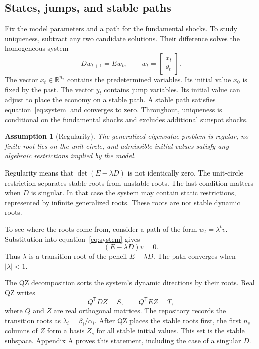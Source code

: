 \documentclass[11pt]{article}
\newtheorem{assumption}{Assumption}
\begin{document}
\subsection{States, jumps, and stable paths}

Fix the model parameters and a path for the fundamental shocks. To study
uniqueness, subtract any two candidate solutions. Their difference solves the
homogeneous system
\begin{equation}
    D w_{t+1}=E w_t,
    \qquad
    w_t=\begin{bmatrix}x_t\\y_t\end{bmatrix}.
    \label{eq:system}
\end{equation}
The vector $x_t\in\mathbb{R}^{n_x}$ contains the predetermined variables. Its
initial value $x_0$ is fixed by the past. The vector $y_t$ contains jump
variables. Its initial value can adjust to place the economy on a stable path.
A stable path satisfies equation~\eqref{eq:system} and converges to zero.
Throughout, uniqueness is conditional on the fundamental shocks and excludes
additional sunspot shocks.

\begin{assumption}[Regularity]\label{ass:regularity}
The generalized eigenvalue problem is regular, no finite root lies on the unit
circle, and admissible initial values satisfy any algebraic restrictions
implied by the model.
\end{assumption}

Regularity means that $\det(E-\lambda D)$ is not identically zero. The
unit-circle restriction separates stable roots from unstable roots. The last
condition matters when $D$ is singular. In that case the system may contain
static restrictions, represented by infinite generalized roots. These roots
are not stable dynamic roots.

To see where the roots come from, consider a path of the form
$w_t=\lambda^t v$. Substitution into equation~\eqref{eq:system} gives
\[
    (E-\lambda D)v=0.
\]
Thus $\lambda$ is a transition root of the pencil $E-\lambda D$. The path
converges when $|\lambda|<1$.

The QZ decomposition sorts the system's dynamic directions by their roots.
Real QZ writes
\begin{equation}
    Q^{\mathsf T}DZ=S,
    \qquad
    Q^{\mathsf T}EZ=T,
    \label{eq:qz}
\end{equation}
where $Q$ and $Z$ are real orthogonal matrices. The repository records the
transition roots as $\lambda_i=\beta_i/\alpha_i$. After QZ places the stable
roots first, the first $n_s$ columns of $Z$ form a basis $Z_s$ for all stable
initial values. This set is the stable subspace. Appendix A proves this
statement, including the case of a singular $D$.
\end{document}
